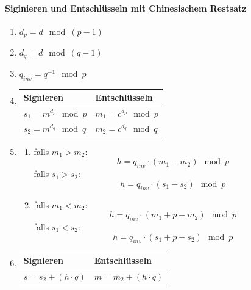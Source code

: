 \documentclass[8pt,a4paper,landscape]{article}
\begin{document}
\begin{multicols}{4}
\paragraph{Siginieren und Entschlüsseln mit Chinesischem Restsatz}
\begin{enumerate}
\item $d_p = d \mod (p-1)$ 
\item $d_q = d \mod (q-1)$
\item $q_{inv} = q^{-1} \mod p$
\item 
\begin{tabular}[t]{p{2.8cm} | p{2.8cm}}
Signieren & Entschlüsseln \\ \hline
$s_1 = m^{d_p} \mod p$ & $m_1 = c^{d_p} \mod p$ \\[0.2cm]
$s_2 = m^{d_q} \mod q$ & $m_2 = c^{d_q} \mod q$
\end{tabular}
\item \begin{enumerate}
\item falls $m_1 > m_2$: \[h = q_{inv} \cdot (m_1 - m_2) \mod p\] 
		falls $s_1 > s_2$: \[h = q_{inv} \cdot (s_1 - s_2) \mod p\] 
\item falls $m_1 < m_2$: \[h = q_{inv} \cdot (m_1 + p - m_2) \mod p\] 
		falls $s_1 < s_2$: \[h = q_{inv} \cdot (s_1 + p - s_2) \mod p\]\end{enumerate}
\item \begin{tabular}[t]{p{2.8cm} | p{2.8cm}}
Signieren & Entschlüsseln \\ \hline
$s = s_2 + (h \cdot q)$ & $m = m_2 + (h \cdot q)$
\end{tabular}
\end{enumerate}


\end{multicols}
\end{document}
